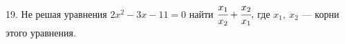 19. Не решая уравнения $2x^2-3x-11=0$ найти $\cfrac{x_1}{x_2}+\cfrac{x_2}{x_1},$ где $x_1,\ x_2$ --- корни этого уравнения.\\
